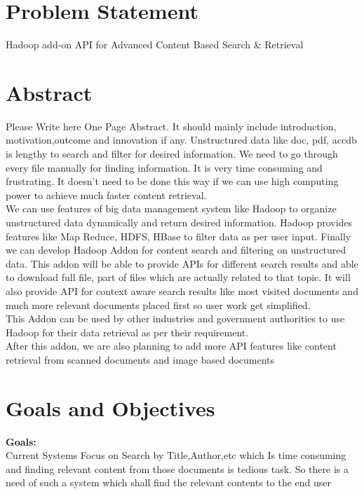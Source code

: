 \documentclass[oneside,a4paper,12pt]{report}
\begin{document}
\section{Problem Statement}
\label{sec:problem}
Hadoop add-on API for Advanced Content Based Search \& Retrieval
\section{Abstract}
Please Write here One Page Abstract. It should mainly include introduction, motivation,outcome and innovation if any.
Unstructured data like doc, pdf, accdb is lengthy to search and filter for desired information. We need to go through every file manually for finding information. It is very time consuming and frustrating. It doesn’t need to be done this way if we can use high computing power to achieve much faster content retrieval. \\

We can use features of big data management system like Hadoop to organize unstructured data dynamically and return desired information. Hadoop provides features like Map Reduce, HDFS, HBase to filter data as per user input. Finally we can develop Hadoop Addon for content search and filtering on unstructured data. This addon will be able to provide APIs for different search results and able to download full file, part of files which are actually related to that topic. It will also provide API for context aware search results like most visited documents and much more relevant documents placed first so user work get simplified.  \\

This Addon can be used by other industries and government authorities to use Hadoop for their data retrieval as per their requirement. \\

After this addon, we are also planning to add more API features like content retrieval from scanned documents and image based documents \\

\section{Goals and Objectives}
\textbf{Goals:} \\
Current Systems Focus on Search by Title,Author,etc which Is time consuming and finding relevant content from those documents is tedious task. So there is a need of such a system which shall find the relevant contents to the end user \\
\end{document}
